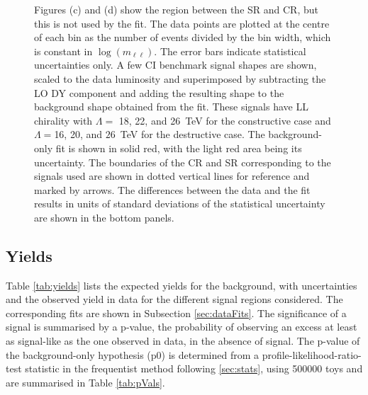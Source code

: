 \begin{figure}[!htpb]
{Figures (c) and (d) show the region between the SR and CR, but this is not used by the fit.
The data points are plotted at the centre of each bin as the number of events divided by the bin width, which is constant in $\log{(m_{\ell\ell})}$.
The error bars indicate statistical uncertainties only.
A few CI benchmark signal shapes are shown, scaled to the data luminosity and superimposed by subtracting the LO DY component and adding the resulting shape to the background shape obtained from the fit.
These signals have LL chirality with $\Lambda=$ 18, 22, and 26~TeV for the constructive case and $\Lambda=$16, 20, and $26$~TeV for the destructive case.
The background-only fit is shown in solid red, with the light red area being its uncertainty.
The boundaries of the CR and SR corresponding to the signals used are shown in dotted vertical lines for reference and marked by arrows.
The differences between the data and the fit results in units of standard deviations of the statistical uncertainty are shown in the bottom panels.
}
\label{fig:ciCiFits}
\end{figure}


\label{sec:Yields}
\subsection{Yields}

Table \ref{tab:yields} lists the expected yields for the background, with uncertainties and the observed yield in data for the different signal regions considered. The corresponding fits are shown in Subsection \ref{sec:dataFits}. The significance of a signal is summarised by a p-value, the probability of observing an excess at least as signal-like as the one observed in data, in the absence of signal. The p-value of the background-only hypothesis (p0) is determined from a profile-likelihood-ratio-test statistic in the frequentist method following \ref{sec:stats}, using 500000 toys and are summarised in Table \ref{tab:pVals}.

